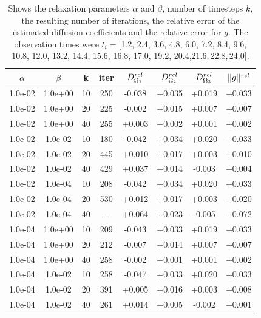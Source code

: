 \documentclass[12pt,a4paper]{article}
\begin{document}
\begin{table}
\centering
\caption{ Shows the relaxation parameters $\alpha$ and $\beta$, number of timesteps $k$, the resulting number of iterations, the relative error of the estimated diffusion coefficients and the relative error for $g$. The observation times were $t_i = [ $1.2, 2.4, 3.6, 4.8, 6.0, 7.2, 8.4, 9.6, 10.8, 12.0, 13.2, 14.4, 15.6, 16.8, 17.0, 19.2, 20.4,$ 21.6, 22.8, 24.0 ]$.}
\begin{tabular}{*{8}c}
$\alpha$ & $\beta$ & k & iter & $ D_{\Omega_1}\sp{rel}$ & $ D_{\Omega_2}\sp{rel}$ & $D_{\Omega_3}\sp{rel} $ & $|| g ||\sp{rel} $ \\
\hline

 1.0e-02 	 & 1.0e+00 	 & 10 & 250 	 & -0.038 & +0.035 & +0.019 & +0.033 \\ 
 1.0e-02 	 & 1.0e+00 	 & 20 & 225 	 & -0.002 & +0.015 & +0.007 & +0.007 \\ 
 1.0e-02 	 & 1.0e+00 	 & 40 & 255 	 & +0.003 & +0.002 & +0.001 & +0.002 \\ 

 1.0e-02 	 & 1.0e-02 	 & 10 & 180 	 & -0.042 & +0.034 & +0.020 & +0.033 \\ 
 1.0e-02 	 & 1.0e-02 	 & 20 & 445 	 & +0.010 & +0.017 & +0.003 & +0.010 \\ 
  1.0e-02 	 & 1.0e-02 	 & 40 & 429 	 & +0.037 & +0.014 & -0.003 & +0.004 \\ 
  
 1.0e-02 	 & 1.0e-04 	 & 10 & 208 	 & -0.042 & +0.034 & +0.020 & +0.033 \\ 
  1.0e-02 	 & 1.0e-04 	 & 20 & 530 	 & +0.012 & +0.017 & +0.003 & +0.020 \\ 
 1.0e-02 	 & 1.0e-04 	 & 40 & - 	 & +0.064 & +0.023 & -0.005 & +0.072 \\ 
 
 1.0e-04 	 & 1.0e+00 	 & 10 & 209 	 & -0.043 & +0.033 & +0.019 & +0.033 \\ 
 1.0e-04 	 & 1.0e+00 	 & 20 & 212 	 & -0.007 & +0.014 & +0.007 & +0.007 \\ 
 1.0e-04 	 & 1.0e+00 	 & 40 & 258 	 & -0.002 & +0.001 & +0.001 & +0.002 \\ 
 
 1.0e-04 	 & 1.0e-02 	 & 10 & 258 	 & -0.047 & +0.033 & +0.020 & +0.033 \\ 
 1.0e-04 	 & 1.0e-02 	 & 20 & 391 	 & +0.005 & +0.016 & +0.003 & +0.008 \\ 
 1.0e-04 	 & 1.0e-02 	 & 40 & 261 	 & +0.014 & +0.005 & -0.002 & +0.001 \\ 
 

\end{tabular}
\end{table}
\end{document}
